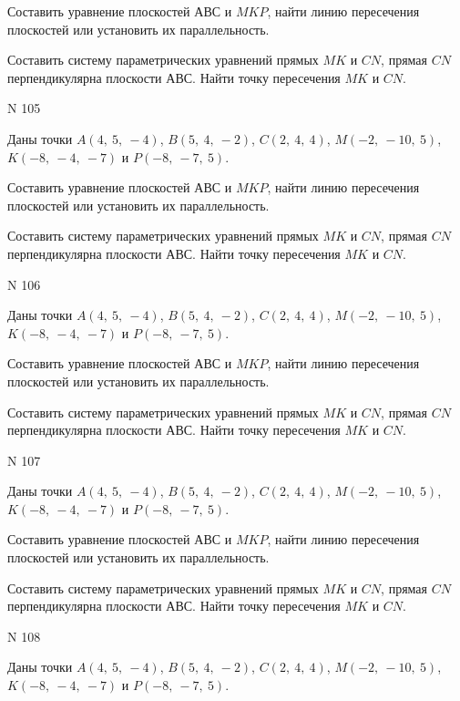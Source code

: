 \documentclass[11pt]{report}
\begin{document}
Составить уравнение плоскостей $АВС$ и $MKP$,
найти линию пересечения плоскостей или установить их параллельность.

Составить систему параметрических уравнений прямых $MK$ и $CN$,
прямая $CN$ перпендикулярна плоскости $АВС$. 
Найти точку пересечения $MK$ и $CN$.



 N 105

Даны точки $A\left( 4, \  5, \  -4\right)$, $B\left( 5, \  4, \  -2\right)$, $C\left( 2, \  4, \  4\right)$, $M\left( -2, \  -10, \  5\right)$, $K\left( -8, \  -4, \  -7\right)$ и $P\left( -8, \  -7, \  5\right)$.


Составить уравнение плоскостей $АВС$ и $MKP$,
найти линию пересечения плоскостей или установить их параллельность.

Составить систему параметрических уравнений прямых $MK$ и $CN$,
прямая $CN$ перпендикулярна плоскости $АВС$. 
Найти точку пересечения $MK$ и $CN$.



 N 106

Даны точки $A\left( 4, \  5, \  -4\right)$, $B\left( 5, \  4, \  -2\right)$, $C\left( 2, \  4, \  4\right)$, $M\left( -2, \  -10, \  5\right)$, $K\left( -8, \  -4, \  -7\right)$ и $P\left( -8, \  -7, \  5\right)$.


Составить уравнение плоскостей $АВС$ и $MKP$,
найти линию пересечения плоскостей или установить их параллельность.

Составить систему параметрических уравнений прямых $MK$ и $CN$,
прямая $CN$ перпендикулярна плоскости $АВС$. 
Найти точку пересечения $MK$ и $CN$.



 N 107

Даны точки $A\left( 4, \  5, \  -4\right)$, $B\left( 5, \  4, \  -2\right)$, $C\left( 2, \  4, \  4\right)$, $M\left( -2, \  -10, \  5\right)$, $K\left( -8, \  -4, \  -7\right)$ и $P\left( -8, \  -7, \  5\right)$.


Составить уравнение плоскостей $АВС$ и $MKP$,
найти линию пересечения плоскостей или установить их параллельность.

Составить систему параметрических уравнений прямых $MK$ и $CN$,
прямая $CN$ перпендикулярна плоскости $АВС$. 
Найти точку пересечения $MK$ и $CN$.



 N 108

Даны точки $A\left( 4, \  5, \  -4\right)$, $B\left( 5, \  4, \  -2\right)$, $C\left( 2, \  4, \  4\right)$, $M\left( -2, \  -10, \  5\right)$, $K\left( -8, \  -4, \  -7\right)$ и $P\left( -8, \  -7, \  5\right)$.
\end{document}
